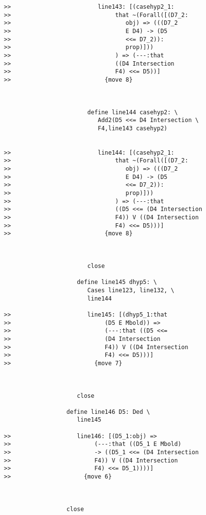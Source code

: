 \documentclass[12pt]{article}
\begin{document}
\begin{verbatim}
>>                         line143: [(casehyp2_1:
>>                              that ~(Forall([(D7_2:
>>                                 obj) => (((D7_2
>>                                 E D4) -> (D5
>>                                 <<= D7_2)):
>>                                 prop)]))
>>                              ) => (---:that
>>                              ((D4 Intersection
>>                              F4) <<= D5))]
>>                           {move 8}



                        define line144 casehyp2: \
                           Add2(D5 <<= D4 Intersection \
                           F4,line143 casehyp2)


>>                         line144: [(casehyp2_1:
>>                              that ~(Forall([(D7_2:
>>                                 obj) => (((D7_2
>>                                 E D4) -> (D5
>>                                 <<= D7_2)):
>>                                 prop)]))
>>                              ) => (---:that
>>                              ((D5 <<= (D4 Intersection
>>                              F4)) V ((D4 Intersection
>>                              F4) <<= D5)))]
>>                           {move 8}



                        close

                     define line145 dhyp5: \
                        Cases line123, line132, \
                        line144

>>                      line145: [(dhyp5_1:that
>>                           (D5 E Mbold)) =>
>>                           (---:that ((D5 <<=
>>                           (D4 Intersection
>>                           F4)) V ((D4 Intersection
>>                           F4) <<= D5)))]
>>                        {move 7}



                     close

                  define line146 D5: Ded \
                     line145

>>                   line146: [(D5_1:obj) =>
>>                        (---:that ((D5_1 E Mbold)
>>                        -> ((D5_1 <<= (D4 Intersection
>>                        F4)) V ((D4 Intersection
>>                        F4) <<= D5_1))))]
>>                     {move 6}



                  close


\end{verbatim}
\end{document}
